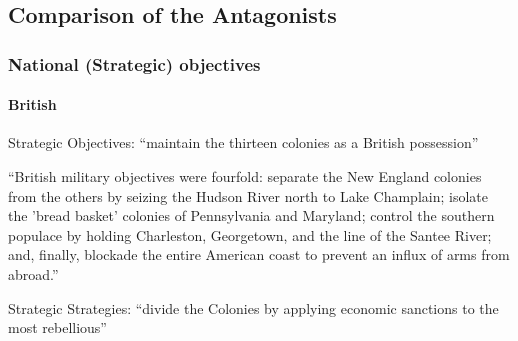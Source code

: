 \subsection{Comparison of the Antagonists}

% 



\subsubsection{National (Strategic) objectives}


\paragraph{British}

Strategic Objectives: ``maintain the thirteen colonies as a British
possession''\cite[2]{moncure_cowpens_1996}

``British military objectives were fourfold: separate the New England colonies
from the others by seizing the Hudson River north to Lake Champlain; isolate the
'bread basket' colonies of Pennsylvania and Maryland; control the southern
populace by holding Charleston, Georgetown, and the line of the Santee River;
and, finally, blockade the entire American coast to prevent an influx of arms
from abroad.''\cite[2]{moncure_cowpens_1996}

Strategic Strategies: ``divide the Colonies by applying economic sanctions to
the most rebellious''\cite[2]{moncure_cowpens_1996}



